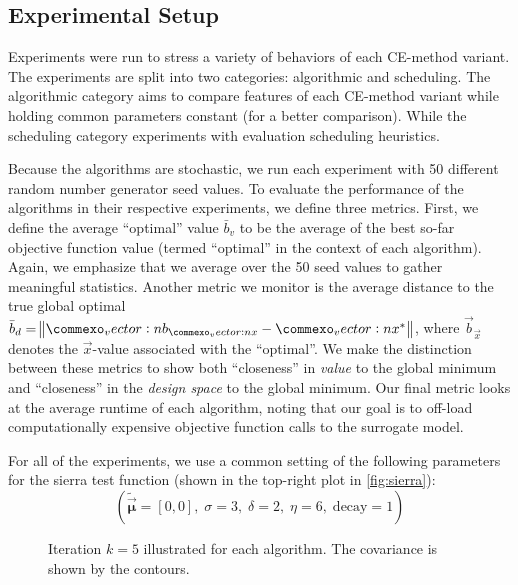 \subsection{Experimental Setup} \label{sec:cem_experiment_setup}
Experiments were run to stress a variety of behaviors of each CE-method variant.
The experiments are split into two categories: algorithmic and scheduling.
The algorithmic category aims to compare features of each CE-method variant while holding common parameters constant (for a better comparison).
While the scheduling category experiments with evaluation scheduling heuristics.


Because the algorithms are stochastic, we run each experiment with 50 different random number generator seed values.
To evaluate the performance of the algorithms in their respective experiments, we define three metrics.
First, we define the average ``optimal'' value $\bar{b}_v$ to be the average of the best so-far objective function value (termed ``optimal'' in the context of each algorithm). Again, we emphasize that we average over the 50 seed values to gather meaningful statistics.
Another metric we monitor is the average distance to the true global optimal $\bar{b}_d = \norm{\vec{b}_{\vec{x}} - \vec{x}^*}$, where $\vec{b}_{\vec{x}}$ denotes the $\vec{x}$-value associated with the ``optimal''.
We make the distinction between these metrics to show both ``closeness'' in \textit{value} to the global minimum and ``closeness'' in the \textit{design space} to the global minimum.
Our final metric looks at the average runtime of each algorithm, noting that our goal is to off-load computationally expensive objective function calls to the surrogate model.

For all of the experiments, we use a common setting of the following parameters for the sierra test function (shown in the top-right plot in \cref{fig:sierra}):
\begin{equation*}
    (\mathbf{\widetilde{\vec{\mu}}} =[0,0],\; \sigma=3,\; \delta=2,\; \eta=6,\; \text{decay} = 1)
\end{equation*}

\begin{figure*}[!b]
  \centering
  \caption{
    \label{fig:k5} Iteration $k=5$ illustrated for each algorithm. The covariance is shown by the contours.
  } 
\end{figure*}


